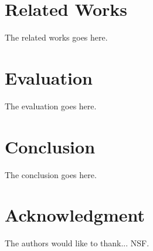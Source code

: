 \documentclass[conference]{IEEEtran}
\begin{document}
\section{Related Works}
The related works goes here.

\section{Evaluation}
The evaluation goes here.

\section{Conclusion}
The conclusion goes here.

\section*{Acknowledgment}
The authors would like to thank... NSF.
\\



\end{document}
